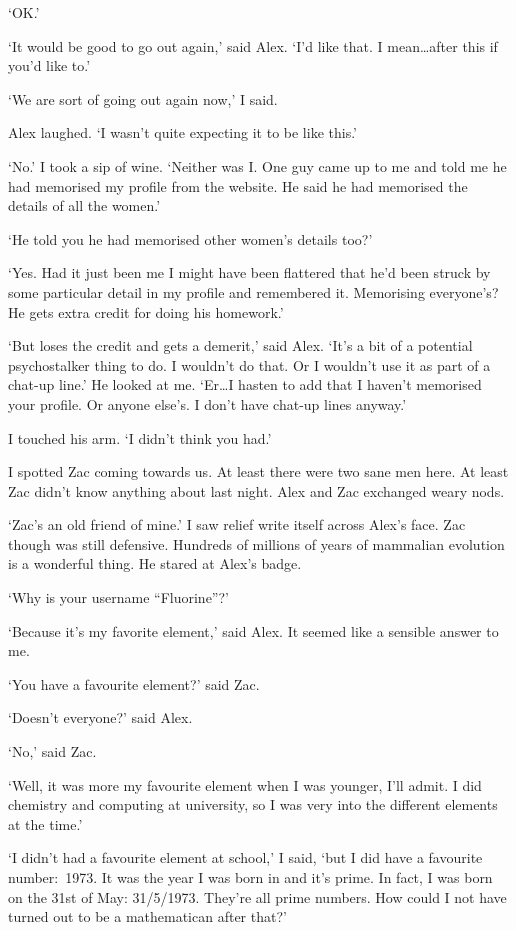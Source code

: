 `OK.'

`It would be good to go out again,' said Alex. `I'd like that. I
mean\dots after this if you'd like to.'

`We are sort of going out again now,' I said.

Alex laughed. `I wasn't quite expecting it to be like this.'

`No.' I took a sip of wine. `Neither was I. One guy came up to me
and told me he had memorised my profile from the website. He said he
had memorised the details of all the women.'

`He told you he had memorised other women's details too?'

`Yes. Had it just been me I might have been flattered that he'd been
struck by some particular detail in my profile and remembered it.
Memorising everyone's? He gets extra credit for doing his homework.'

`But loses the credit and gets a demerit,' said Alex. `It's a bit of
a potential psychostalker thing to do. I wouldn't do that. Or I
wouldn't use it as part of a chat-up line.' He looked at me.
`Er\dots I hasten to add that I haven't memorised your profile. Or
anyone else's. I don't have chat-up lines anyway.'

I touched his arm. `I didn't think you had.'

I spotted Zac coming towards us. At least there were two sane men
here. At least Zac didn't know anything about last night. Alex and
Zac exchanged weary nods.

`Zac's an old friend of mine.' I saw relief write itself across
Alex's face. Zac though was still defensive. Hundreds of millions of
years of mammalian evolution is a wonderful thing. He stared at
Alex's badge.

`Why is your username ``Fluorine''?'

`Because it's my favorite element,' said Alex. It seemed like a
sensible answer to me.

`You have a favourite element?' said Zac.

`Doesn't everyone?' said Alex.

`No,' said Zac.

`Well, it was more my favourite element when I was younger, I'll
admit. I did chemistry and computing at university, so I was very into the different
elements at the time.'

`I didn't had a favourite element at school,' I said, `but I did
have a favourite number:~1973. It was the year I was born in and
it's prime. In fact, I was born on the 31st of May: 31/5/1973.
They're all prime numbers. How could I not have turned out to be a
mathematican after that?'

